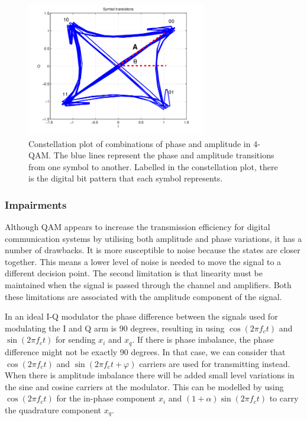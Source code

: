 \documentclass[12pt,a4paper,openright]{report}
\begin{document}
 \begin{figure}[H]
  \centering
    \includegraphics[width=0.7\textwidth]{4symboltransitions.png}
    \caption[Constellation plot of combinations of phase and amplitude in 4-QAM]{Constellation plot of combinations of phase and amplitude in 4-QAM. The blue lines represent the phase and amplitude transitions from one symbol to another. Labelled in the constellation plot, there is the digital bit pattern that each symbol represents.}
    \label{fig:4qamsym}
\end{figure}



\subsubsection{Impairments}
Although QAM appears to increase the transmission efficiency for digital communication systems by utilising both amplitude and phase variations, it has a number of drawbacks. It is more susceptible to noise because the states are closer together. This means a lower level of noise is needed to move the signal to a different decision point. The second limitation is that linearity must be maintained when the signal is passed through the channel and amplifiers. Both these limitations are associated with the amplitude component of the signal. 

In an ideal I-Q modulator the phase difference between the signals used for modulating the I and Q arm is 90 degrees, resulting in using $\cos (2\pi {f_c}t)$ and $\sin (2\pi {f_c}t)$ for sending $x_i$ and $x_q$. If there is phase imbalance, the phase difference might not be exactly 90 degrees. In that case, we can consider that $\cos (2\pi {f_c}t)$ and $\sin (2\pi {f_c}t + \varphi )$ carriers are used for transmitting instead.
When there is amplitude imbalance there will be added small level variations in the sine and cosine carriers at the modulator. This can be modelled by using $\cos (2\pi {f_c}t)$ for the in-phase component $x_i$ and  $(1 + \alpha )\sin (2\pi {f_c}t)$ to carry the quadrature component $x_q$.
\end{document}
